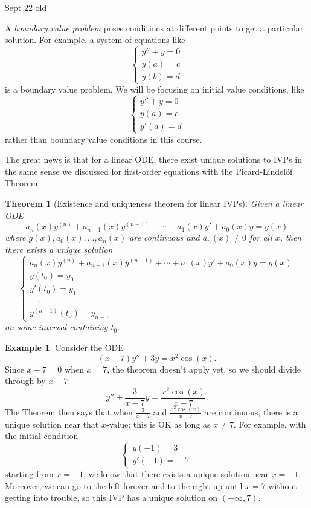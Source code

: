 \documentclass[12pt]{amsart}
\numberwithin{equation}{section}
\theoremstyle{plain} %
\newtheorem{thm}[equation]{Theorem}
\newcommand{\Sept}[1]{Sept #1 old}
\theoremstyle{definition}
\newtheorem{ex}[equation]{Example}
\theoremstyle{remark}
\begin{document}
\Sept{22}

A \emph{boundary value problem} poses conditions at different points to get a particular solution. For example, a system of equations like
\[\begin{cases} y'' + y = 0 \\ y(a) = c \\ y(b)=d\end{cases}\] is a boundary value problem.
We will be focusing on initial value conditions, like
\[\begin{cases} y'' + y = 0 \\ y(a) = c \\ y'(a)=d\end{cases}\] 
rather than boundary value conditions in this course.

The great news is that for a linear ODE, there exist unique solutions to IVPs in the same sense we discussed for first-order equations with the Picard-Lindel\"of Theorem.

\begin{thm}[Existence and uniqueness theorem for linear IVPs]
Given a linear ODE
\[ a_n(x) y^{(n)} + a_{n-1}(x) y^{(n-1)} + \cdots + a_1(x) y' + a_0(x) y = g(x)\]
where $g(x), a_0(x), \dots, a_n(x)$ are continuous and $a_n(x)\neq 0$ for all $x$, then there exists a unique solution
\[ \begin{cases} 
a_n(x) y^{(n)} + a_{n-1}(x) y^{(n-1)} + \cdots + a_1(x) y' + a_0(x) y = g(x) \\
y(t_0) = y_0\\
y'(t_0) = y_1 \\
 \quad  \vdots\\
y^{(n-1)}(t_0) = y_{n-1}
\end{cases}\]
on some interval containing $t_0$.
\end{thm}

\begin{ex} Consider the ODE
\[ (x-7) y'' + 3y = x^2 \cos(x).\]
Since $x-7=0$ when $x=7$, the theorem doesn't apply yet, so we should divide through by $x-7$:
\[ y'' + \frac{3}{x-7} y = \frac{x^2 \cos(x) }{x-7}.\]
The Theorem then says that when $\frac{3}{x-7}$ and $\frac{x^2 \cos(x) }{x-7}$ are continuous, there is a unique solution near that $x$-value: this is OK as long as $x\neq 7$.
For example, with the initial condition
\[ \begin{cases} y(-1) = 3 \\ y'(-1) = -.7\end{cases} \]
starting from $x=-1$, we know that there exists a unique solution near $x=-1$. Moreover, we can go to the left forever and to the right up until $x=7$ without getting into trouble, so this IVP has a unique solution on $(-\infty , 7)$.
\end{ex}
\end{document}
